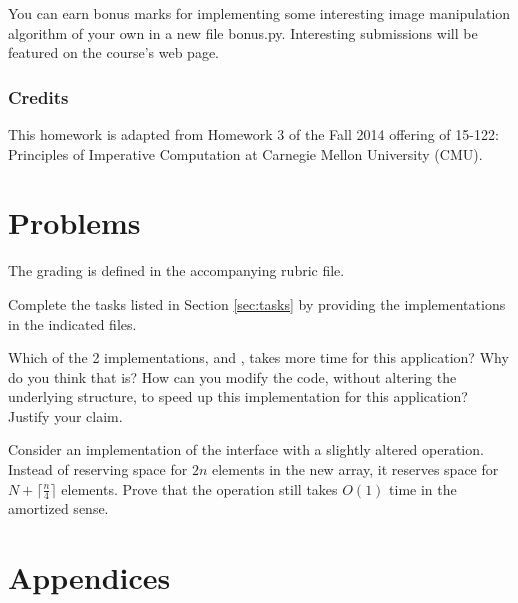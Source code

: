 \documentclass[addpoints]{exam}
\begin{document}
  You can earn bonus marks for implementing some interesting image manipulation algorithm of your own in a new file  \textsf{bonus.py}. Interesting submissions will be featured on the course's web page.

  \section{Credits}

  This homework is adapted from Homework 3 of the Fall 2014 offering of 15-122: Principles of Imperative Computation at Carnegie Mellon University (CMU).


\part{Problems}

  The grading is defined in the accompanying rubric file.
  \begin{questions}
   Complete the tasks listed in Section \ref{sec:tasks} by providing the implementations in the indicated files.
    
   Which of the 2 implementations,  and , takes more time for this application? Why do you think that is? How can you modify the code, without altering the underlying structure, to speed up this implementation for this application? Justify your claim.
    \begin{solution}
      
    \end{solution}

    Consider an  implementation of the  interface with a slightly altered  operation. Instead of reserving space for $2n$ elements in the new array, it reserves space for $N + \lceil \frac{n}{4} \rceil$ elements. Prove that the  operation still takes $O(1)$ time in the amortized sense.
    \begin{solution}
      
    \end{solution}
    
  \end{questions}

  \newpage
\part{Appendices}
\end{document}
